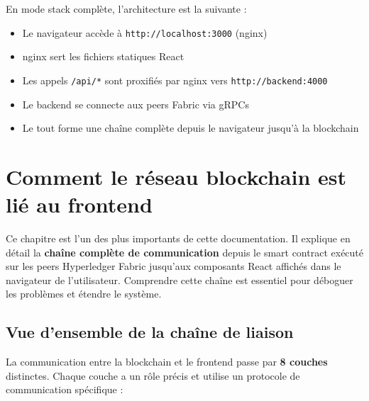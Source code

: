 \documentclass[12pt,a4paper,twoside]{report}
\begin{document}
\begin{successbox}
En mode stack complète, l'architecture est la suivante :
\begin{itemize}
    \item Le navigateur accède à \texttt{http://localhost:3000} (nginx)
    \item nginx sert les fichiers statiques React
    \item Les appels \texttt{/api/*} sont proxifiés par nginx vers \texttt{http://backend:4000}
    \item Le backend se connecte aux peers Fabric via gRPCs
    \item Le tout forme une chaîne complète depuis le navigateur jusqu'à la blockchain
\end{itemize}
\end{successbox}


\chapter{Comment le réseau blockchain est lié au frontend}

Ce chapitre est l'un des plus importants de cette documentation. Il explique en détail la \textbf{chaîne complète de communication} depuis le smart contract exécuté sur les peers Hyperledger Fabric jusqu'aux composants React affichés dans le navigateur de l'utilisateur. Comprendre cette chaîne est essentiel pour déboguer les problèmes et étendre le système.

\section{Vue d'ensemble de la chaîne de liaison}

La communication entre la blockchain et le frontend passe par \textbf{8 couches} distinctes. Chaque couche a un rôle précis et utilise un protocole de communication spécifique :
\end{document}
